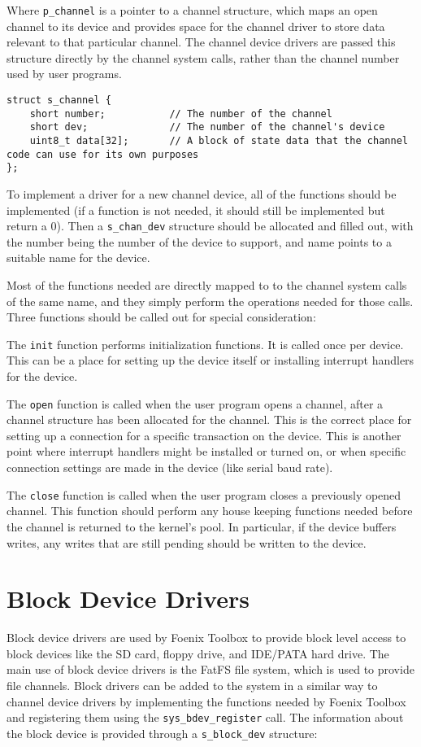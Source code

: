Where \verb+p_channel+ is a pointer to a channel structure, which maps an open channel to its device and provides space for the channel driver to store data relevant to that particular channel. The channel device drivers are passed this structure directly by the channel system calls, rather than the channel number used by user programs.

\begin{lstlisting}
struct s_channel {
    short number;           // The number of the channel
    short dev;              // The number of the channel's device
    uint8_t data[32];       // A block of state data that the channel code can use for its own purposes
};
\end{lstlisting}

To implement a driver for a new channel device, all of the functions should be implemented (if a function is not needed, it should still be implemented but return a 0). Then a \verb+s_chan_dev+ structure should be allocated and filled out, with the number being the number of the device to support, and name points to a suitable name for the device.

Most of the functions needed are directly mapped to to the channel system calls of the same name, and they simply perform the operations needed for those calls. Three functions should be called out for special consideration:

The \verb+init+ function performs initialization functions. It is called once per device. This can be a place for setting up the device itself or installing interrupt handlers for the device.

The \verb+open+ function is called when the user program opens a channel, after a channel structure has been allocated for the channel. This is the correct place for setting up a connection for a specific transaction on the device. This is another point where interrupt handlers might be installed or turned on, or when specific connection settings are made in the device (like serial baud rate).

The \verb+close+ function is called when the user program closes a previously opened channel. This function should perform any house keeping functions needed before the channel is returned to the kernel's pool. In particular, if the device buffers writes, any writes that are still pending should be written to the device.

\section{Block Device Drivers}
Block device drivers are used by Foenix Toolbox to provide block level access to block devices like the SD card, floppy drive, and IDE/PATA hard drive. The main use of block device drivers is the FatFS file system, which is used to provide file channels. Block drivers can be added to the system in a similar way to channel device drivers by implementing the functions needed by Foenix Toolbox and registering them using the \verb+sys_bdev_register+ call. The information about the block device is provided through a \verb+s_block_dev+ structure:

